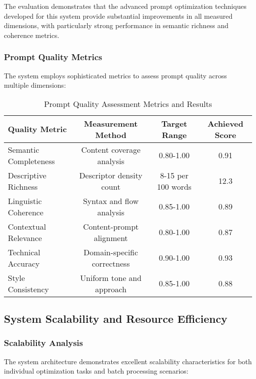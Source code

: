 \begin{table}[H]
\begin{table}[H]
The evaluation demonstrates that the advanced prompt optimization techniques developed for this system provide substantial improvements in all measured dimensions, with particularly strong performance in semantic richness and coherence metrics.

\subsubsection{Prompt Quality Metrics}

The system employs sophisticated metrics to assess prompt quality across multiple dimensions:

\begin{table}[H]
\centering
\caption{Prompt Quality Assessment Metrics and Results}
\label{tab:prompt_quality_metrics}
{\begin{tabular}{lccc}
\toprule
\textbf{Quality Metric} & \textbf{Measurement Method} & \textbf{Target Range} & \textbf{Achieved Score} \\
\midrule
Semantic Completeness & Content coverage analysis & 0.80-1.00 & 0.91 \\
Descriptive Richness & Descriptor density count & 8-15 per 100 words & 12.3 \\
Linguistic Coherence & Syntax and flow analysis & 0.85-1.00 & 0.89 \\
Contextual Relevance & Content-prompt alignment & 0.80-1.00 & 0.87 \\
Technical Accuracy & Domain-specific correctness & 0.90-1.00 & 0.93 \\
Style Consistency & Uniform tone and approach & 0.85-1.00 & 0.88 \\
\bottomrule
\end{tabular}}
\end{table}

\subsection{System Scalability and Resource Efficiency}

\subsubsection{Scalability Analysis}

The system architecture demonstrates excellent scalability characteristics for both individual optimization tasks and batch processing scenarios:


\end{table}
\end{table}

